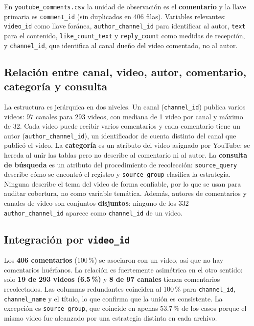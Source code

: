 \documentclass[11pt,a4paper]{article}
\begin{document}
En \texttt{youtube\_comments.csv} la unidad de observaci\'on es el \textbf{comentario} y la llave primaria
es \texttt{comment\_id} (sin duplicados en 406 filas). Variables relevantes: \texttt{video\_id} como
llave for\'anea, \texttt{author\_channel\_id} para identificar al autor, \texttt{text} para el contenido,
\texttt{like\_count\_text} y \texttt{reply\_count} como medidas de recepci\'on, y \texttt{channel\_id},
que identifica al canal due\~no del video comentado, no al autor.

\subsection{Relaci\'on entre canal, video, autor, comentario, categor\'ia y consulta}
La estructura es jer\'arquica en dos niveles. Un canal (\texttt{channel\_id}) publica varios videos:
97 canales para 293 videos, con mediana de 1 video por canal y m\'aximo de 32. Cada video puede recibir
varios comentarios y cada comentario tiene un autor (\texttt{author\_channel\_id}), un identificador de
cuenta distinto del canal que public\'o el video. La \textbf{categor\'ia} es un atributo del video
asignado por YouTube; se hereda al unir las tablas pero no describe al comentario ni al autor. La
\textbf{consulta de b\'usqueda} es un atributo del procedimiento de recolecci\'on: \texttt{source\_query}
describe c\'omo se encontr\'o el registro y \texttt{source\_group} clasifica la estrategia. Ninguna
describe el tema del video de forma confiable, por lo que se usan para auditar cobertura, no como
variable tem\'atica. Adem\'as, autores de comentarios y canales de video son conjuntos \textbf{disjuntos}:
ninguno de los 332 \texttt{author\_channel\_id} aparece como \texttt{channel\_id} de un video.

\subsection{Integraci\'on por \texttt{video\_id}}
Los \textbf{406 comentarios} (100\,\%) se asociaron con un video, as\'i que no hay comentarios hu\'erfanos.
La relaci\'on es fuertemente asim\'etrica en el otro sentido: solo \textbf{19 de 293 videos (6.5\,\%)} y
\textbf{8 de 97 canales} tienen comentarios recolectados. Las columnas redundantes coinciden al 100\,\%
para \texttt{channel\_id}, \texttt{channel\_name} y el t\'itulo, lo que confirma que la uni\'on es
consistente. La excepci\'on es \texttt{source\_group}, que coincide en apenas 53.7\,\% de los casos
porque el mismo video fue alcanzado por una estrategia distinta en cada archivo.
\end{document}

